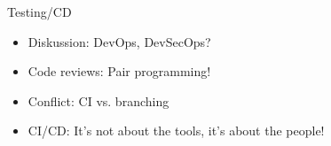 \begin{frame}[allowframebreaks]{Testing/CD}
	\begin{itemize}
		\item Diskussion: DevOps, DevSecOps?
		\item Code reviews: Pair programming!
		\item Conflict: CI vs. branching
		\item CI/CD: It's not about the tools, it's about the people!
	\end{itemize}
\end{frame}

